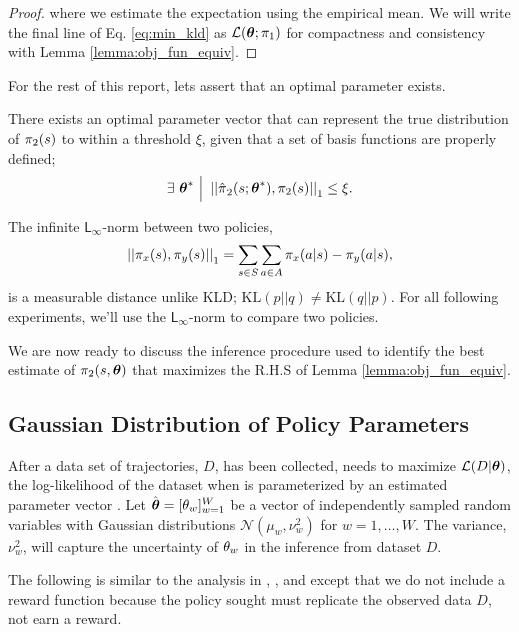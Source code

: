 \begin{proof}
        \noindent
        where we estimate the expectation using the empirical mean. We will write the final line of Eq.
        \ref{eq:min_kld} as $\mathcal{L}(\boldsymbol{\mathbb{\theta}}; \pi_{1})$ for compactness and consistency with Lemma
        \ref{lemma:obj_fun_equiv}.

    \end{proof}

    For the rest of this report, lets assert that an optimal parameter exists.
    \begin{assumption}\label{assump:opt_policy_err}
        There exists an optimal parameter vector that can represent the true distribution of $\pi_{2}(s)$ to within a
        threshold $\xi$, given that a set of basis functions are properly defined;
        \[
            \exists\ \optimal{\paramVec}\ \Big|\  \OneNorm{\estimate{\policy{}}_2(s;\optimal{\paramVec}),\policy{2}(s)}
                \leq \xi.
        \]
    \end{assumption}

    \noindent
    The infinite $\mathsf{L_{\infty}}$-norm between two policies,
    \[
        \left|\left|\pi_{x}(s),\pi_{y}(s)\right|\right|_1 = \sum_{s \in S}\sum_{a \in A}\pi_{x}(a|s)-\pi_{y}(a|s),
    \]
    is a measurable distance unlike \ac{KLD}; $\text{KL}(p||q) \neq \text{KL}(q||p)$. For all following experiments,
    we'll use the $\mathsf{L_{\infty}}$-norm to compare two policies.

    We are now ready to discuss the inference procedure used to identify the best estimate of $\pi_{2}(s, \boldsymbol{\mathbb{\theta}})$
    that maximizes the R.H.S of Lemma \ref{lemma:obj_fun_equiv}.


\subsection{Gaussian Distribution of Policy Parameters}\label{sec:gauss_policy}

    After a data set of trajectories, $D$, has been collected,  needs to maximize $\mathcal{L}(D|\boldsymbol{\mathbb{\theta}})$, the
    log-likelihood of the dataset when  is parameterized by an estimated parameter vector
    \estimate{\paramVec}. Let $\hat{\boldsymbol{\mathbb{\theta}}} = [ \theta_{w}]_{w=1}^W$ be a vector of independently sampled random
    variables with Gaussian distributions $\mathcal{N}(\mu_w, \nu_w^2)$ for $w=1,\ldots,W$. The variance, $\nu_w^2$,
    will capture the uncertainty of $\theta_{w}$ in the inference from dataset $D$.

    The following is similar to the analysis in \cite{tangkaratt2014model}, \cite{herman2016inverse}, and
    \cite{sehnke2010parameter} except that we do not include a reward function because the policy sought must replicate
    the observed data $D$, not earn a reward.

